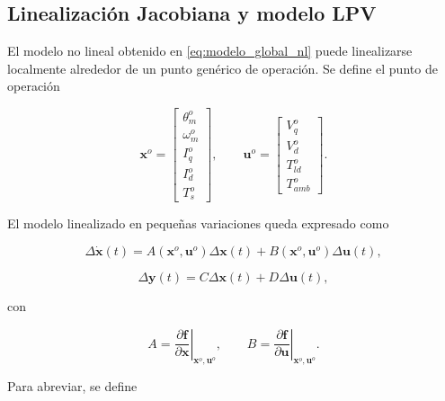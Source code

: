 \documentclass[10pt,a4paper]{article}
\begin{document}
\subsection{Linealización Jacobiana y modelo LPV}

El modelo no lineal obtenido en \eqref{eq:modelo_global_nl} puede linealizarse localmente alrededor de un punto genérico de operación. Se define el punto de operación

\begin{equation}
    \mathbf{x}^{o}=
    \begin{bmatrix}
        \theta_m^{o}\\
        \omega_m^{o}\\
        I_q^{o}\\
        I_d^{o}\\
        T_s^{o}
    \end{bmatrix},
    \qquad
    \mathbf{u}^{o}=
    \begin{bmatrix}
        V_q^{o}\\
        V_d^{o}\\
        T_{ld}^{o}\\
        T_{amb}^{o}
    \end{bmatrix}.
    \label{eq:punto_operacion_generico}
\end{equation}

El modelo linealizado en pequeñas variaciones queda expresado como

\begin{equation}
    \Delta \dot{\mathbf{x}}(t)
    =
    A\left(\mathbf{x}^{o},\mathbf{u}^{o}\right)\Delta\mathbf{x}(t)
    +
    B\left(\mathbf{x}^{o},\mathbf{u}^{o}\right)\Delta\mathbf{u}(t),
    \label{eq:modelo_lpv}
\end{equation}

\begin{equation}
    \Delta \mathbf{y}(t)
    =
    C\Delta\mathbf{x}(t)+D\Delta\mathbf{u}(t),
    \label{eq:salida_lpv}
\end{equation}

con

\begin{equation}
    A=\left.\frac{\partial \mathbf{f}}{\partial \mathbf{x}}\right|_{\mathbf{x}^{o},\mathbf{u}^{o}},
    \qquad
    B=\left.\frac{\partial \mathbf{f}}{\partial \mathbf{u}}\right|_{\mathbf{x}^{o},\mathbf{u}^{o}}.
    \label{eq:jacobianos}
\end{equation}

Para abreviar, se define
\end{document}
